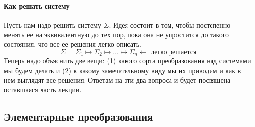 \paragraph{Как решать систему}

Пусть нам надо решить систему $\Sigma$.
Идея состоит в том, чтобы постепенно менять ее на эквивалентную до тех пор, пока она не упростится до такого состояния, что все ее решения легко описать.
\[
\Sigma = \Sigma_1 \mapsto \Sigma_2 \mapsto \ldots \mapsto \Sigma_n \leftarrow\text{ легко решается}
\]
Теперь надо объяснить две вещи: (1) какого сорта преобразования над системами мы будем делать и (2) к какому замечательному виду мы их приводим и как в нем выглядят все решения.
Ответам на эти два вопроса и будет посвящена оставшаяся часть лекции.

\subsection{Элементарные преобразования}
\label{section::Elementary}


